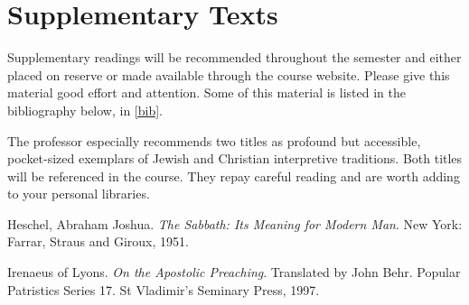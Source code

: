 \documentclass[titlepage]{article}
\begin{document}
\section{Supplementary Texts}
\label{supplementary}

Supplementary readings will be recommended throughout the semester and
either placed on reserve or made available through the course website.
Please give this material good effort and attention. Some of this
material is listed in the bibliography below, in \autoref{bib}. 


The professor especially recommends two titles as profound but
accessible, pocket-sized exemplars of Jewish and Christian interpretive
traditions. Both titles will be referenced in the course. They repay
careful reading and are worth adding to your personal libraries.


\begingroup
\renewcommand{\section}[2]{}%
\begin{thebibliography}{Irenaeus}%

	 Heschel, Abraham Joshua.
	\emph{The Sabbath: Its Meaning for Modern Man}.
	New York: Farrar, Straus and Giroux, 1951.

	 Irenaeus of Lyons.
	\emph{On the Apostolic Preaching}. Translated by John Behr. Popular Patristics Series 17.
	St Vladimir’s Seminary Press, 1997.


\end{thebibliography}
\endgroup
\end{document}
